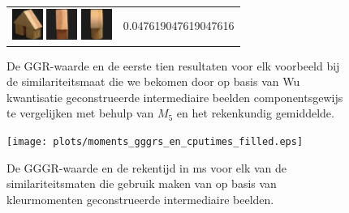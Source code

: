{\begin{figure}[p]
\begin{tabular}{m{11cm} | m{3cm} |}
\includegraphics[width=1cm]{coil/beeld-46.eps}
\includegraphics[width=1cm]{coil/beeld-44.eps}
\includegraphics[width=1cm]{coil/beeld-2.eps}
& {\scriptsize 0.047619047619047616}
\\
\end{tabular}
\vspace{5pt}
\caption{\label{fig:results_beste_dom_colors}De GGR-waarde en de eerste tien resultaten voor elk 
voorbeeld bij de similariteitsmaat die we bekomen door op basis van Wu 
kwantisatie geconstrueerde intermediaire beelden componentsgewijs te vergelijken met behulp van 
$M_5$ en het rekenkundig gemiddelde.}
\end{figure}

\clearpage

\begin{figure}[p]
\centering
\texttt{[image: plots/moments\_gggrs\_en\_cputimes\_filled.eps]}
\vspace{1pt}
\caption{\label{fig:moments_gggrs_en_cputimes}De GGGR-waarde en de rekentijd in ms
voor elk van de similariteitsmaten die gebruik maken
van op basis van kleurmomenten geconstrueerde intermediaire beelden.}
\end{figure}

}
